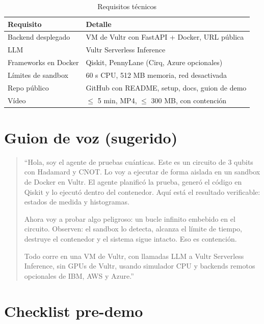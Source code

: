 \documentclass[11pt,a4paper]{article}
\begin{document}
\begin{table}[h]
\centering
\begin{tabular}{ll}
\toprule
\textbf{Requisito} & \textbf{Detalle} \\
\midrule
Backend desplegado & VM de Vultr con FastAPI + Docker, URL pública \\
LLM & Vultr Serverless Inference \\
Frameworks en Docker & Qiskit, PennyLane (Cirq, Azure opcionales) \\
Límites de sandbox & 60 s CPU, 512 MB memoria, red desactivada \\
Repo público & GitHub con README, setup, docs, guion de demo \\
Vídeo & $\leq$ 5 min, MP4, $\leq$ 300 MB, con contención \\
\bottomrule
\end{tabular}
\caption{Requisitos técnicos}
\end{table}

\section{Guion de voz (sugerido)}

\begin{quote}
``Hola, soy el agente de pruebas cuánticas. Este es un circuito de 3 qubits con
Hadamard y CNOT. Lo voy a ejecutar de forma aislada en un sandbox de Docker en
Vultr. El agente planificó la prueba, generó el código en Qiskit y lo ejecutó
dentro del contenedor. Aquí está el resultado verificable: estados de medida y
histogramas.

Ahora voy a probar algo peligroso: un bucle infinito embebido en el circuito.
Observen: el sandbox lo detecta, alcanza el límite de tiempo, destruye el
contenedor y el sistema sigue intacto. Eso es contención.

Todo corre en una VM de Vultr, con llamadas LLM a Vultr Serverless Inference, sin
GPUs de Vultr, usando simulador CPU y backends remotos opcionales de IBM, AWS y
Azure.''
\end{quote}

\section{Checklist pre-demo}
\end{document}
